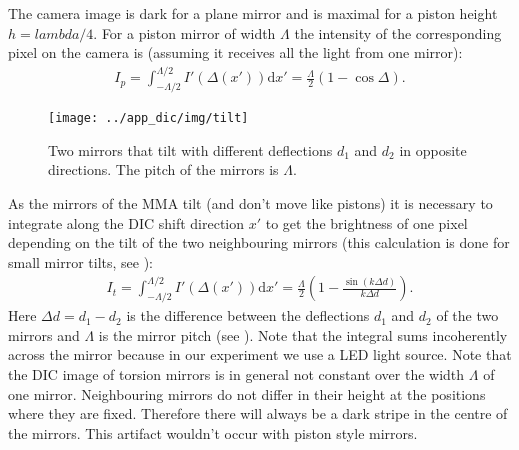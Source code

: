 The camera image is dark for a plane mirror and is maximal for a
piston height $h=lambda/4$.
For a piston mirror of width $\Lambda$ the intensity of the
corresponding pixel on the camera is (assuming it receives all the
light from one mirror):
\begin{align}
  I_p=\int_{-\Lambda/2}^{\Lambda/2} I'(\Delta(x'))\textrm{d}x'=\frac{\Lambda}{2}(1-\cos \Delta).
\end{align}
\begin{figure}[ht]
  \centering
  \texttt{[image: ../app\_dic/img/tilt]}
  \caption{ Two mirrors that tilt with different deflections $d_1$ and
    $d_2$ in opposite directions. The pitch of the mirrors is
    $\Lambda$.}
  \label{fig:tilt}
\end{figure}
As the mirrors of the MMA tilt (and don't move like pistons) it is
necessary to integrate along the DIC shift direction $x'$ to get the
brightness of one pixel depending on the tilt of the two neighbouring
mirrors (this calculation is done for small mirror tilts, see
): 
\begin{align}
\label{eqn:it}
  I_t=\int_{-\Lambda/2}^{\Lambda/2} I'(\Delta(x')) \textrm{d}x'=\frac{\Lambda}{2}\left(1-\frac{\sin(k \Delta d)}{k \Delta d}\right).
\end{align}
Here $\Delta d=d_1-d_2$ is the difference between the deflections
$d_1$ and $d_2$ of the two mirrors and $\Lambda$ is the mirror pitch
(see ). Note that the integral sums incoherently
across the mirror because in our experiment we use a LED light
source. Note that the DIC image of torsion mirrors is in general not
constant over the width $\Lambda$ of one mirror. Neighbouring mirrors
do not differ in their height at the positions where they are
fixed. Therefore there will always be a dark stripe in the centre of
the mirrors. This artifact wouldn't occur with piston style mirrors.

